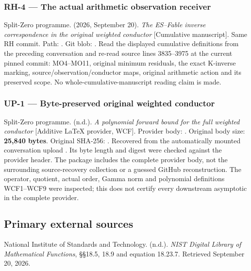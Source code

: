 \subsubsection{RH-4 --- The actual arithmetic observation
receiver}\label{rh-4-the-actual-arithmetic-observation-receiver}

Split-Zero programme. (2026, September 20). \emph{The ES--Fable inverse
correspondence in the original weighted conductor} {[}Cumulative
manuscript{]}. Same RH commit. Path:
.
Git blob: . Read the
displayed cumulative definitions from the preceding conversation and
re-read source lines 3835--3975 at the current pinned commit: MO4--MO11,
original minimum residuals, the exact K-inverse marking,
source/observation/conductor maps, original arithmetic action and its
preserved scope. No whole-cumulative-manuscript reading claim is made.

\subsubsection{UP-1 --- Byte-preserved original weighted
conductor}\label{up-1-byte-preserved-original-weighted-conductor}

Split-Zero programme. (n.d.). \emph{A polynomial forward bound for the
full weighted conductor} {[}Additive LaTeX provider, WCF{]}. Provider
body: . Original body size:
\textbf{25,840 bytes}. Original SHA-256:
.
Recovered from the automatically mounted conversation upload
. Its byte length and digest
were checked against the provider header. The package includes the
complete provider body, not the surrounding source-recovery collection
or a guessed GitHub reconstruction. The operator, quotient, actual
order, Gamma norm and polynomial definitions WCF1--WCF9 were inspected;
this does not certify every downstream asymptotic in the complete
provider.

\subsection{Primary external sources}\label{primary-external-sources}

National Institute of Standards and Technology. (n.d.). \emph{NIST
Digital Library of Mathematical Functions}, §§18.5, 18.9 and equation
18.23.7. Retrieved September 20, 2026.

